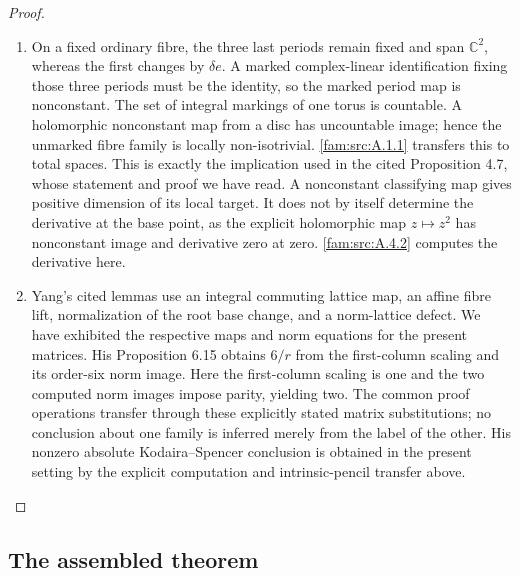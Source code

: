 \begin{proof}
\begin{enumerate}[label=\arabic*.,leftmargin=*]
\item On a fixed ordinary fibre, the three last periods remain fixed and span $\mathbb C^2$, whereas the first changes by $\delta e$. A marked complex-linear identification fixing those three periods must be the identity, so the marked period map is nonconstant. The set of integral markings of one torus is countable. A holomorphic nonconstant map from a disc has uncountable image; hence the unmarked fibre family is locally non-isotrivial. \ref{fam:src:A.1.1} transfers this to total spaces. This is exactly the implication used in the cited Proposition 4.7, whose statement and proof we have read. A nonconstant classifying map gives positive dimension of its local target. It does not by itself determine the derivative at the base point, as the explicit holomorphic map $z\mapsto z^2$ has nonconstant image and derivative zero at zero. \ref{fam:src:A.4.2} computes the derivative here.

\item Yang's cited lemmas use an integral commuting lattice map, an affine fibre lift, normalization of the root base change, and a norm-lattice defect. We have exhibited the respective maps and norm equations for the present matrices. His Proposition 6.15 obtains $6/r$ from the first-column scaling and its order-six norm image. Here the first-column scaling is one and the two computed norm images impose parity, yielding two. The common proof operations transfer through these explicitly stated matrix substitutions; no conclusion about one family is inferred merely from the label of the other. His nonzero absolute Kodaira--Spencer conclusion is obtained in the present setting by the explicit computation and intrinsic-pencil transfer above.
\end{enumerate}
\end{proof}

\subsection{The assembled theorem}\label{fam:section:A.5}

